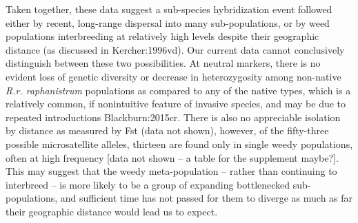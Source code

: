 \documentclass[twocolumn]{bmcart}%
\begin{document}
Taken together, these data suggest a sub-species hybridization event followed either by recent, long-range dispersal into many sub-populations, or by weed populations interbreeding at relatively high levels despite their geographic distance (as discussed in {Kercher:1996vd}). Our current data cannot conclusively distinguish between these two possibilities. At neutral markers, there is no evident loss of genetic diversity or decrease in heterozygosity among non-native \textit{R.r. raphanistrum} populations as compared to any of the native types, which is a relatively common, if nonintuitive feature of invasive species, and may be due to repeated introductions {Blackburn:2015cr}. There is also no appreciable isolation by distance as measured by Fst (data not shown), however, of the fifty-three possible microsatellite alleles, thirteen are found only in single weedy populations, often at high frequency [data not shown – a table for the supplement maybe?]. This may suggest that the weedy meta-population – rather than continuing to interbreed – is more likely to be a group of expanding bottlenecked sub-populations, and sufficient time has not passed for them to diverge as much as far their geographic distance would lead us to expect. 
\end{document}
